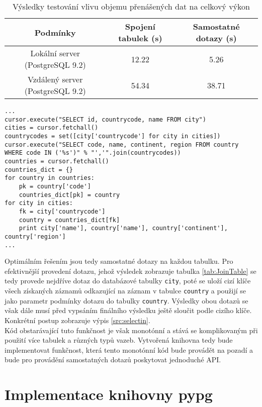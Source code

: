 \documentclass[ing,male,java,dept456]{diploma}						%
\begin{document}
\begin{table}
  \centering
  \begin{tabular}{|c|c|c|}
    \hline
    Podmínky & Spojení tabulek (s) & Samostatné dotazy (s)\\
    \hline
    Lokální server (PostgreSQL 9.2) & 12.22 & 5.26 \\
    \hline
    Vzdálený server (PostgreSQL 9.2) & 54.34 & 38.71 \\
    \hline
  \end{tabular}
  \caption{Výsledky testování vlivu objemu přenášených dat na celkový výkon}
  \label{tab:ProofTable}
\end{table}

\begin{lstlisting}[style=custompython, label=src:selectin, caption={Získávání dat pomocí samostatných dotazů}]
...
cursor.execute("SELECT id, countrycode, name FROM city")
cities = cursor.fetchall()
countrycodes = set([city['countrycode'] for city in cities])
cursor.execute("SELECT code, name, continent, region FROM country WHERE code IN ('%s')" % "','".join(countrycodes))
countries = cursor.fetchall()
countries_dict = {}
for country in countries:
    pk = country['code']
    countries_dict[pk] = country
for city in cities:
    fk = city['countrycode']
    country = countries_dict[fk]
    print city['name'], country['name'], country['continent'], country['region']
...
\end{lstlisting}

Optimálním řešením jsou tedy samostatné dotazy na každou tabulku. Pro efektivnější provedení dotazu, jehož výsledek zobrazuje tabulka \ref{tab:JoinTable} se tedy provede nejdříve dotaz do databázové tabulky \lstinline[style=inlinepython]|city|, poté se uloží cizí klíče všech získaných záznamů odkazující na záznam v tabulce \lstinline[style=inlinepython]|country| a použijí se jako parametr podmínky dotazu do tabulky \lstinline[style=inlinepython]|country|. Výsledky obou dotazů se však dále musí před vypsáním finálního výsledku ještě sloučit podle cizího klíče. Konkrétní postup zobrazuje výpis \ref{src:selectin}. \\
Kód obstarávající tuto funkčnost je však monotónní a stává se komplikovaným při použití více tabulek a různých typů vazeb. Vytvořená knihovna tedy bude implementovat funkčnost, která tento monotónní kód bude provádět na pozadí a bude pro provádění samostatných dotazů poskytovat jednoduché API.

\section{Implementace knihovny pypg}
\label{sec:Impl}
\end{document}
